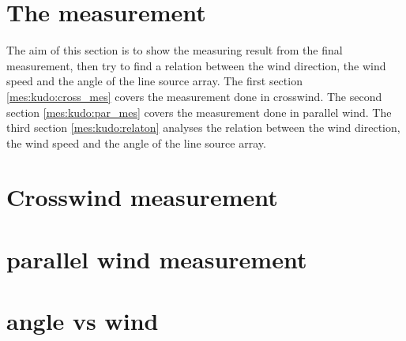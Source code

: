 \section{The measurement}
The aim of this section is to show the measuring result from the final measurement, then try to find a relation between the wind direction, the wind speed and the angle of the line source array. The first section \autoref{mes:kudo:cross_mes} covers the measurement done in crosswind. The second section \autoref{mes:kudo:par_mes} covers the measurement done in parallel wind. The third section \autoref{mes:kudo:relaton} analyses the relation between the wind direction, the wind speed and the angle of the line source array.

\section{Crosswind measurement}\label{mes:kudo:cross_mes}

\section{parallel wind measurement}\label{mes:kudo:par_mes}

\section{angle vs wind}\label{mes:kudo:relaton}